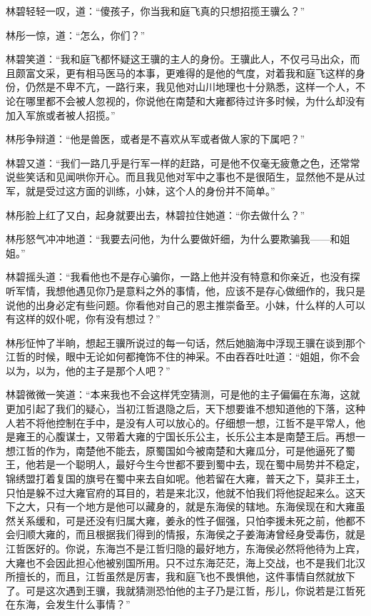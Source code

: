林碧轻轻一叹，道：“傻孩子，你当我和庭飞真的只想招揽王骥么？”

林彤一惊，道：“怎么，你们？”

林碧笑道：“我和庭飞都怀疑这王骥的主人的身份。王骥此人，不仅弓马出众，而且颇富文采，更有相马医马的本事，更难得的是他的气度，对着我和庭飞这样的身份，仍然是不卑不亢，一路行来，我见他对山川地理也十分熟悉，这样一个人，不论在哪里都不会被人忽视的，你说他在南楚和大雍都待过许多时候，为什么却没有加入军旅或者被人招揽。”

林彤争辩道：“他是兽医，或者是不喜欢从军或者做人家的下属吧？”

林碧又道：“我们一路几乎是行军一样的赶路，可是他不仅毫无疲惫之色，还常常说些笑话和见闻哄你开心。而且我见他对军中之事也不是很陌生，显然他不是从过军，就是受过这方面的训练，小妹，这个人的身份并不简单。”

林彤脸上红了又白，起身就要出去，林碧拉住她道：“你去做什么？”

林彤怒气冲冲地道：“我要去问他，为什么要做奸细，为什么要欺骗我——和姐姐。”

林碧摇头道：“我看他也不是存心骗你，一路上他并没有特意和你亲近，也没有探听军情，我想他遇见你乃是意料之外的事情，他，应该不是存心做细作的，我只是说他的出身必定有些问题。你看他对自己的恩主推崇备至。小妹，什么样的人可以有这样的奴仆呢，你有没有想过？”

林彤怔忡了半晌，想起王骥所说过的每一句话，然后她脑海中浮现王骥在谈到那个江哲的时候，眼中无论如何都掩饰不住的神采。不由吞吞吐吐道：“姐姐，你不会以为，以为，他的主子是那个人吧？”

林碧微微一笑道：“本来我也不会这样凭空猜测，可是他的主子偏偏在东海，这就更加引起了我们的疑心，当初江哲退隐之后，天下想要谁不想知道他的下落，这种人若不将他控制在手中，是没有人可以放心的。仔细想一想，江哲不是平常人，他是雍王的心腹谋士，又带着大雍的宁国长乐公主，长乐公主本是南楚王后。再想一想江哲的作为，南楚他不能去，原蜀国如今被南楚和大雍瓜分，可是他逼死了蜀王，他若是一个聪明人，最好今生今世都不要到蜀中去，现在蜀中局势并不稳定，锦绣盟打着复国的旗号在蜀中来去自如呢。他若留在大雍，普天之下，莫非王土，只怕是躲不过大雍官府的耳目的，若是来北汉，他就不怕我们将他捉起来么。这天下之大，只有一个地方是他可以藏身的，就是东海侯的辖地。东海侯现在和大雍虽然关系缓和，可是还没有归属大雍，姜永的性子倔强，只怕李援未死之前，他都不会归顺大雍的，而且根据我们得到的情报，东海侯之子姜海涛曾经身受毒伤，就是江哲医好的。你说，东海岂不是江哲归隐的最好地方，东海侯必然将他待为上宾，大雍也不会因此担心他被别国所用。只不过东海茫茫，海上交战，也不是我们北汉所擅长的，而且，江哲虽然是厉害，我和庭飞也不畏惧他，这件事情自然就放下了。可是这次遇到王骥，我就猜测恐怕他的主子乃是江哲，彤儿，你说若是江哲死在东海，会发生什么事情？”

